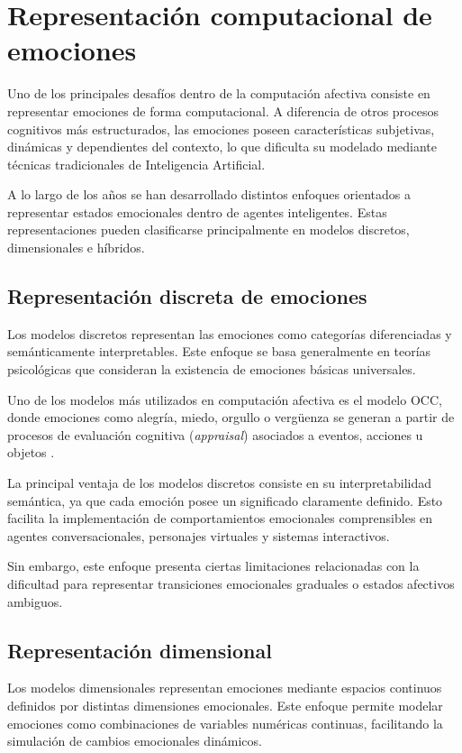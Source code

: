 \section{Representación computacional de emociones}

Uno de los principales desafíos dentro de la computación afectiva consiste en representar emociones de forma computacional. A diferencia de otros procesos cognitivos más estructurados, las emociones poseen características subjetivas, dinámicas y dependientes del contexto, lo que dificulta su modelado mediante técnicas tradicionales de Inteligencia Artificial.

A lo largo de los años se han desarrollado distintos enfoques orientados a representar estados emocionales dentro de agentes inteligentes. Estas representaciones pueden clasificarse principalmente en modelos discretos, dimensionales e híbridos.

\subsection{Representación discreta de emociones}

Los modelos discretos representan las emociones como categorías diferenciadas y semánticamente interpretables. Este enfoque se basa generalmente en teorías psicológicas que consideran la existencia de emociones básicas universales.

Uno de los modelos más utilizados en computación afectiva es el modelo OCC, donde emociones como alegría, miedo, orgullo o vergüenza se generan a partir de procesos de evaluación cognitiva (\textit{appraisal}) asociados a eventos, acciones u objetos \cite{occ2009revisited}.

La principal ventaja de los modelos discretos consiste en su interpretabilidad semántica, ya que cada emoción posee un significado claramente definido. Esto facilita la implementación de comportamientos emocionales comprensibles en agentes conversacionales, personajes virtuales y sistemas interactivos.

Sin embargo, este enfoque presenta ciertas limitaciones relacionadas con la dificultad para representar transiciones emocionales graduales o estados afectivos ambiguos.

\subsection{Representación dimensional}

Los modelos dimensionales representan emociones mediante espacios continuos definidos por distintas dimensiones emocionales. Este enfoque permite modelar emociones como combinaciones de variables numéricas continuas, facilitando la simulación de cambios emocionales dinámicos.

